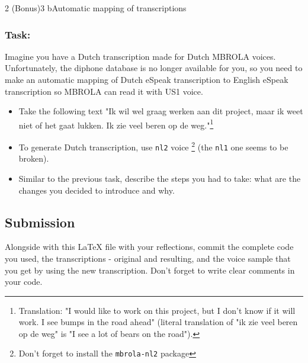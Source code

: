 \documentclass{../labbook}
\begin{document}
\begin{problem}{2 (Bonus)}{3 b}{Automatic mapping of transcriptions}
\subsubsection*{Task:}
\noindent Imagine you have a Dutch transcription made for Dutch MBROLA voices. Unfortunately, the diphone database is no longer available for you, so you need to make an automatic mapping of Dutch eSpeak transcription to English eSpeak transcription so MBROLA can read it with US1 voice.
\begin{itemize}
    \item Take the following text "Ik wil wel graag werken aan dit project, maar ik weet niet of het gaat lukken. Ik zie veel beren op de weg."\footnote{Translation: "I would like to work on this project, but I don't know if it will work. I see bumps in the road ahead" (literal translation of "ik zie veel beren op de weg" is "I see a lot of bears on the road").}
    \item To generate Dutch transcription, use \texttt{nl2} voice \footnote{Don't forget to install the \texttt{mbrola-nl2} package} (the \texttt{nl1} one seems to be broken).
    \item Similar to the previous task, describe the steps you had to take: what are the changes you decided to introduce and why. 
\end{itemize}

\subsection*{Submission}
\noindent Alongside with this LaTeX file with your reflections, commit the complete code you used, the transcriptions - original and resulting, and the voice sample that you get by using the new transcription. Don't forget to write clear comments in your code.
\end{problem}
\end{document}
